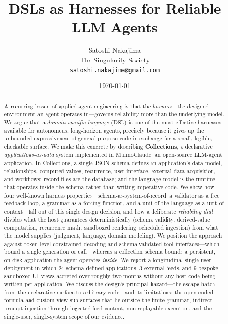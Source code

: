\documentclass[11pt]{article}
\title{\textbf{DSLs as Harnesses for Reliable LLM Agents}}
\author{
  Satoshi Nakajima\\
  \small The Singularity Society\\
  \small \texttt{satoshi.nakajima@gmail.com}
}
\date{\today}
\begin{document}
\maketitle
\let\thefootnote\relax{}

\begin{abstract}
A recurring lesson of applied agent engineering is that the \emph{harness}---the
designed environment an agent operates in---governs reliability more than the
underlying model. We argue that a \emph{domain-specific language} (DSL) is one of
the most effective harnesses available for autonomous, long-horizon agents,
precisely because it gives up the unbounded expressiveness of general-purpose
code in exchange for a small, legible, checkable surface. We make this concrete
by describing \textbf{Collections}, a declarative \emph{applications-as-data}
system implemented in MulmoClaude, an open-source LLM-agent application. In
Collections, a single JSON schema defines an application's data model,
relationships, computed values, recurrence, user interface, external-data
acquisition, and workflows; record files are the database; and the language model
is the runtime that operates inside the schema rather than writing imperative
code. We show how four well-known harness properties---schema-as-system-of-record,
a validator as a free feedback loop, a grammar as a forcing function, and a unit
of the language as a unit of context---fall out of this single design decision,
and how a deliberate \emph{reliability dial} divides what the host guarantees
deterministically (schema validity, derived-value computation, recurrence math,
sandboxed rendering, scheduled ingestion) from what the model supplies (judgment,
language, domain modeling). We position the approach against token-level
constrained decoding and schema-validated tool interfaces---which bound a single
generation or call---whereas a collection schema bounds a persistent, on-disk
application the agent operates \emph{inside}. We report a longitudinal single-user
deployment in which 24 schema-defined applications, 3 external feeds, and 9 bespoke
sandboxed UI views accreted over roughly two months without any host code being
written per application. We discuss the design's principal hazard---the escape hatch from the
declarative surface to arbitrary code---and its limitations: the open-ended
formula and custom-view sub-surfaces that lie outside the finite grammar, indirect
prompt injection through ingested feed content, non-replayable execution, and the
single-user, single-system scope of our evidence.
\end{abstract}
\end{document}
